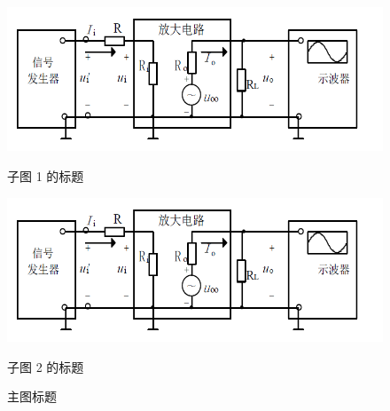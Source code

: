 \documentclass{article}
\begin{document}
	
	\begin{figure}
		\begin{minipage}{0.45\textwidth}
			\centering
			\includegraphics[width=\textwidth]{1-2.png}
			\caption{子图 1 的标题}
		\end{minipage}
		\hfill
		\begin{minipage}{0.45\textwidth}
			\centering
			\includegraphics[width=\textwidth]{1-2.png}
			\caption{子图 2 的标题}
		\end{minipage}
		\caption{主图标题}
	\end{figure}
	
\end{document}
